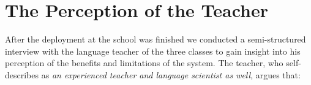 
\newcommand{\q}[1]{($Q_#1$)}
\newcommand{\qq}[2]{($Q_#1,Q_{#2}$)}

\newpage
\section{The Perception of the Teacher}
After the deployment at the school was finished we conducted a semi-structured interview with the language teacher of the three classes to gain insight into his perception of the benefits and limitations of the system. 
% 
The teacher, who self-describes as {\em an experienced teacher and language scientist as well}, argues that: 

